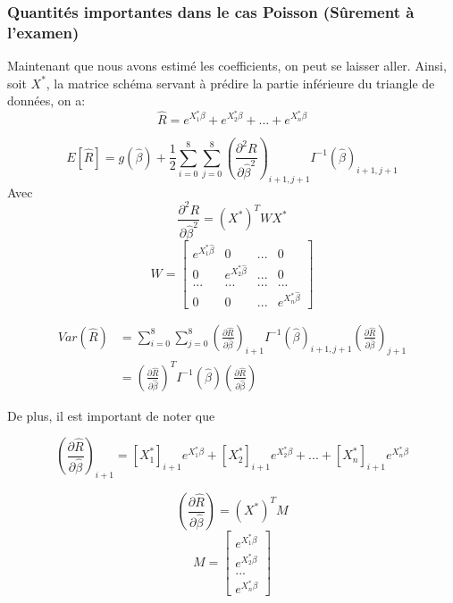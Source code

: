 \documentclass[11pt,french]{report}
\begin{document}
\subsubsection*{Quantités importantes dans le cas Poisson (Sûrement à l'examen)}

Maintenant que nous avons estimé les coefficients, on peut se laisser aller. Ainsi, soit $X^*$, la matrice schéma servant à prédire la partie inférieure du triangle de données, on a:
$$\widehat{R}=e^{X_1^* \beta}+e^{X_2^* \beta}+...+e^{X_n^* \beta}$$

$$\boxed{E[\widehat{R}]  = g(\widehat{\beta}) + \frac{1}{2} \sum_{i=0}^8 \sum_{j=0}^8 \left(\frac{\partial^2 R}{\partial \widehat{\beta}^2}  \right)_{i+1,j+1} I^{-1}(\widehat{\beta})_{i+1,j+1}}$$
Avec
$$\frac{\partial^2 R}{\partial \widehat{\beta}^2}=(X^*)^T W X^*$$
\[
W = 
\begin{bmatrix}
e^{X_1^* \widehat{\beta}} & 0 & ... & 0 \\
0 & e^{X_2^* \widehat{\beta}}  & ... & 0 \\
... & ... & ... & ... \\
0 & 0 & ... & e^{X_n^* \widehat{\beta}}
\end{bmatrix}
\]

$$\boxed{\begin{aligned}
Var(\widehat{R}) &= \sum_{i=0}^8 \sum_{j=0}^8 \left(\frac{\partial \widehat{R}}{\partial \widehat{\beta}} \right)_{i+1} I^{-1}(\widehat{\beta})_{i+1,j+1} \left(\frac{\partial \widehat{R}}{\partial \widehat{\beta}} \right)_{j+1} \\
 &= \left(\frac{\partial \widehat{R}}{\partial \widehat{\beta}} \right)^T I^{-1}(\widehat{\beta}) \left(\frac{\partial \widehat{R}}{\partial \widehat{\beta}} \right)
\end{aligned}}$$

De plus, il est important de noter que

$$\left(\frac{\partial \widehat{R}}{\partial \widehat{\beta}} \right)_{i+1} = [X_1^*]_{i+1}e^{X_1^* \beta} + [X_2^*]_{i+1}e^{X_2^* \beta} + ... + [X_n^*]_{i+1}e^{X_n^* \beta}$$

$$\boxed{\left(\frac{\partial \widehat{R}}{\partial \widehat{\beta}} \right) = (X^*)^T M}$$
\[
M = 
\begin{bmatrix}
e^{X_1^* \beta} \\
e^{X_2^* \beta} \\
... \\
e^{X_n^* \beta}
\end{bmatrix}
\]
\end{document}
